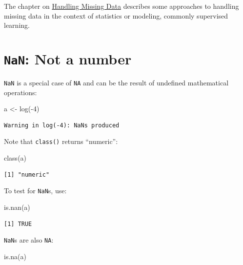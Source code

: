 \documentclass[
]{book}
\newenvironment{Shaded}{\begin{snugshade}}{\end{snugshade}}
\newcommand{\DecValTok}[1]{\textcolor[rgb]{0.00,0.00,0.81}{#1}}
\newcommand{\FunctionTok}[1]{\textcolor[rgb]{0.00,0.00,0.00}{#1}}
\newcommand{\NormalTok}[1]{#1}
\newcommand{\OtherTok}[1]{\textcolor[rgb]{0.56,0.35,0.01}{#1}}
\newcommand{\SpecialCharTok}[1]{\textcolor[rgb]{0.00,0.00,0.00}{#1}}
\begin{document}
The chapter on \protect\hyperlink{missingdata}{Handling Missing Data} describes some approaches to handling missing data in the context of statistics or modeling, commonly supervised learning.

\hypertarget{nan-not-a-number}{%
\section{\texorpdfstring{\texttt{NaN}: Not a number}{NaN: Not a number}}\label{nan-not-a-number}}

\texttt{NaN} is a special case of \texttt{NA} and can be the result of undefined mathematical operations:

\begin{Shaded}
\begin{Highlighting}[]
\NormalTok{a }\OtherTok{\textless{}{-}} \FunctionTok{log}\NormalTok{(}\SpecialCharTok{{-}}\DecValTok{4}\NormalTok{)}
\end{Highlighting}
\end{Shaded}

\begin{verbatim}
Warning in log(-4): NaNs produced
\end{verbatim}

Note that \texttt{class()} returns ``numeric'':

\begin{Shaded}
\begin{Highlighting}[]
\FunctionTok{class}\NormalTok{(a)}
\end{Highlighting}
\end{Shaded}

\begin{verbatim}
[1] "numeric"
\end{verbatim}

To test for \texttt{NaN}s, use:

\begin{Shaded}
\begin{Highlighting}[]
\FunctionTok{is.nan}\NormalTok{(a)}
\end{Highlighting}
\end{Shaded}

\begin{verbatim}
[1] TRUE
\end{verbatim}

\texttt{NaN}s are also \texttt{NA}:

\begin{Shaded}
\begin{Highlighting}[]
\FunctionTok{is.na}\NormalTok{(a)}
\end{Highlighting}
\end{Shaded}
\end{document}

